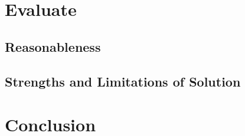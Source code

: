 \documentclass[11pt, letterpaper]{article}
\begin{document}
\par 


\section{Evaluate}



\subsection{Reasonableness}


\subsection{Strengths and Limitations of Solution}


\section{Conclusion}


 
\end{document}
